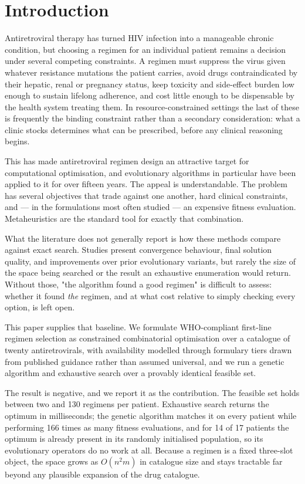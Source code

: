 \documentclass[conference]{IEEEtran}
\begin{document}
\section{Introduction}\label{sec:intro}

Antiretroviral therapy has turned HIV infection into a manageable chronic condition, but choosing a regimen for an individual patient remains a decision under several competing constraints. A regimen must suppress the virus given whatever resistance mutations the patient carries, avoid drugs contraindicated by their hepatic, renal or pregnancy status, keep toxicity and side-effect burden low enough to sustain lifelong adherence, and cost little enough to be dispensable by the health system treating them. In resource-constrained settings the last of these is frequently the binding constraint rather than a secondary consideration: what a clinic stocks determines what can be prescribed, before any clinical reasoning begins.

This has made antiretroviral regimen design an attractive target for computational optimisation, and evolutionary algorithms in particular have been applied to it for over fifteen years. The appeal is understandable. The problem has several objectives that trade against one another, hard clinical constraints, and --- in the formulations most often studied --- an expensive fitness evaluation. Metaheuristics are the standard tool for exactly that combination.

What the literature does not generally report is how these methods compare against exact search. Studies present convergence behaviour, final solution quality, and improvements over prior evolutionary variants, but rarely the size of the space being searched or the result an exhaustive enumeration would return. Without those, "the algorithm found a good regimen" is difficult to assess: whether it found \textit{the} regimen, and at what cost relative to simply checking every option, is left open.

This paper supplies that baseline. We formulate WHO-compliant first-line regimen selection as constrained combinatorial optimisation over a catalogue of twenty antiretrovirals, with availability modelled through formulary tiers drawn from published guidance rather than assumed universal, and we run a genetic algorithm and exhaustive search over a provably identical feasible set.

The result is negative, and we report it as the contribution. The feasible set holds between two and 130 regimens per patient. Exhaustive search returns the optimum in milliseconds; the genetic algorithm matches it on every patient while performing 166 times as many fitness evaluations, and for 14 of 17 patients the optimum is already present in its randomly initialised population, so its evolutionary operators do no work at all. Because a regimen is a fixed three-slot object, the space grows as $O(n^2m)$ in catalogue size and stays tractable far beyond any plausible expansion of the drug catalogue.
\end{document}
